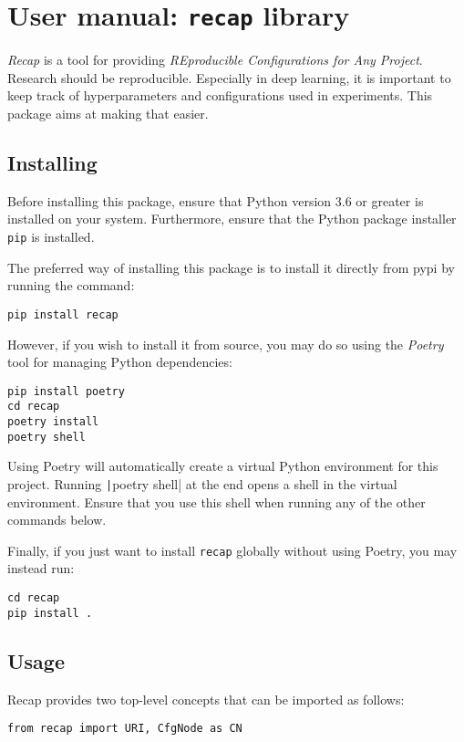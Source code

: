\documentclass[../../report.tex]{subfiles}
\begin{document}
\chapter{User manual: \texttt{recap} library}
\label{chap:user_man_recap}

\emph{Recap} is a tool for providing \emph{REproducible Configurations for Any Project}.
Research should be reproducible.
Especially in deep learning, it is important to keep track of hyperparameters and configurations used in experiments.
This package aims at making that easier.

\section{Installing}
\label{sec:recap_installation}
Before installing this package, ensure that Python version 3.6 or greater is installed on your system.
Furthermore, ensure that the Python package installer \texttt{pip} is installed.

The preferred way of installing this package is to install it directly from \gls{pypi} by running the command:
\begin{verbatim}
pip install recap
\end{verbatim}

However, if you wish to install it from source, you may do so using the \emph{Poetry} tool for managing Python dependencies:
\begin{verbatim}
pip install poetry
cd recap
poetry install
poetry shell
\end{verbatim}
Using Poetry will automatically create a virtual Python environment for this project.
Running \texttt|poetry shell| at the end opens a shell in the virtual environment. 
Ensure that you use this shell when running any of the other commands below.

Finally, if you just want to install \texttt{recap} globally without using Poetry, you may instead run:
\begin{verbatim}
cd recap
pip install .
\end{verbatim}

\section{Usage}
Recap provides two top-level concepts that can be imported as follows:
\begin{verbatim}
from recap import URI, CfgNode as CN
\end{verbatim}
\end{document}
